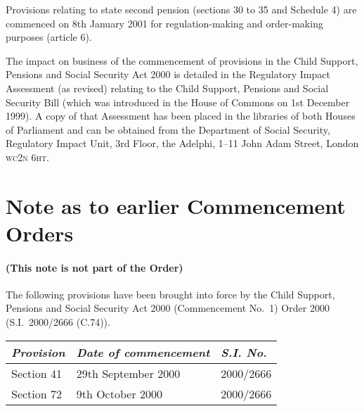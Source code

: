 \documentclass[12pt,a4paper]{article}
\begin{document}
Provisions relating to state second pension (sections 30 to 35 and Schedule 4) are commenced on 8th January 2001 for regulation-making and order-making purposes (article 6).

The impact on business of the commencement of provisions in the Child Support, Pensions and Social Security Act 2000 is detailed in the Regulatory Impact Assessment (as revised) relating to the Child Support, Pensions and Social Security Bill (which was introduced in the House of Commons on 1st December 1999). A copy of that Assessment has been placed in the libraries of both Houses of Parliament and can be obtained from the Department of Social Security, Regulatory Impact Unit, 3rd Floor, the Adelphi, 1--11 John Adam Street, London \textsc{\lowercase{WC2N 6HT}}.  

\part{Note as to earlier Commencement Orders}

\renewcommand\parthead{--- Note as to earlier Commencement Orders}

\subsection*{(This note is not part of the Order)}

The following provisions have been brought into force by the Child Support, Pensions and Social Security Act 2000 (Commencement No.\ 1) Order 2000 (S.I.\ 2000/2666 (C.74)).

{\footnotesize\noindent
\begin{tabulary}{\linewidth}{JJJ}
\hline
\itshape Provision	&\itshape Date of commencement	&\itshape S.I. No.\\
\hline
Section 41	&29th September 2000	&2000/2666\\
Section 72	&9th October 2000	&2000/2666\\
\hline
\end{tabulary}

}
\end{document}
